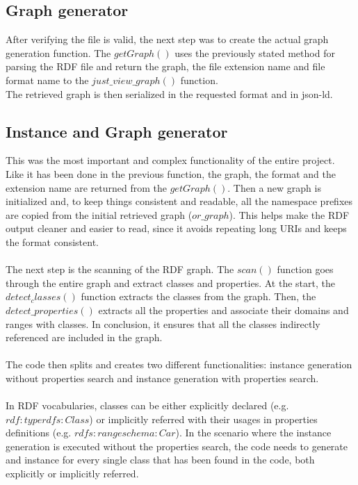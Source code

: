 \subsection{Graph generator}
After verifying the file is valid, the next step was to create the actual graph generation function. The $getGraph()$ uses the previously stated method for parsing the RDF file and return the graph, the file extension name and file format name to the $just\_view\_graph()$ function. 
\\
The retrieved graph is then serialized in the requested format and in json-ld.

\subsection{Instance and Graph generator}
This was the most important and complex functionality of the entire project. 
Like it has been done in the previous function, the graph, the format and the extension name are returned from the $getGraph()$.
Then a new graph is initialized and, to keep things consistent and readable, all the namespace prefixes are copied from the initial retrieved graph ($or\_graph$).
This helps make the RDF output cleaner and easier to read, since it avoids repeating long URIs and keeps the format consistent.
\\
\\
The next step is the scanning of the RDF graph. The $scan()$ function goes through the entire graph and extract classes and properties. 
At the start, the $detect_classes()$ function extracts the classes from the graph. Then, the $detect\_properties()$ extracts all the properties and associate their domains and ranges with classes. In conclusion, it ensures that all the classes indirectly referenced are included in the graph.
\\
\\
The code then splits and creates two different functionalities: instance generation without properties search and instance generation with properties search.
\\
\\
In RDF vocabularies, classes can be either explicitly declared (e.g. $rdf:type rdfs:Class$) or implicitly referred with their usages in properties definitions (e.g. $rdfs:range schema:Car$).
In the scenario where the instance generation is executed without the properties search, the code needs to generate and instance for every single class that has been found in the code, both explicitly or implicitly referred. 
\\

